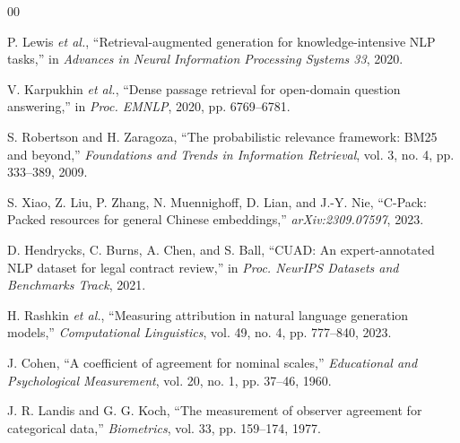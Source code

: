 \documentclass[conference]{IEEEtran}
\begin{document}
\begin{thebibliography}{00}

 P. Lewis \textit{et al.}, ``Retrieval-augmented
generation for knowledge-intensive NLP tasks,'' in \textit{Advances in Neural
Information Processing Systems 33}, 2020.

 V. Karpukhin \textit{et al.}, ``Dense passage
retrieval for open-domain question answering,'' in \textit{Proc. EMNLP}, 2020,
pp. 6769--6781.

 S. Robertson and H. Zaragoza, ``The probabilistic
relevance framework: BM25 and beyond,'' \textit{Foundations and Trends in
Information Retrieval}, vol. 3, no. 4, pp. 333--389, 2009.

 S. Xiao, Z. Liu, P. Zhang, N. Muennighoff, D. Lian, and
J.-Y. Nie, ``C-Pack: Packed resources for general Chinese embeddings,''
\textit{arXiv:2309.07597}, 2023.

 D. Hendrycks, C. Burns, A. Chen, and S. Ball,
``CUAD: An expert-annotated NLP dataset for legal contract review,'' in
\textit{Proc. NeurIPS Datasets and Benchmarks Track}, 2021.

 H. Rashkin \textit{et al.}, ``Measuring attribution in
natural language generation models,'' \textit{Computational Linguistics},
vol. 49, no. 4, pp. 777--840, 2023.

 J. Cohen, ``A coefficient of agreement for nominal
scales,'' \textit{Educational and Psychological Measurement}, vol. 20, no. 1,
pp. 37--46, 1960.

 J. R. Landis and G. G. Koch, ``The measurement of
observer agreement for categorical data,'' \textit{Biometrics}, vol. 33,
pp. 159--174, 1977.

\end{thebibliography}
\end{document}
